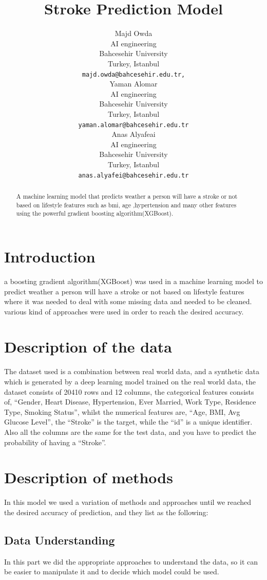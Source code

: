 \documentclass{article}
\title{Stroke Prediction Model}
\author{%
  Majd Owda \\
  AI engineering\\
  Bahcesehir University\\
  Turkey, Istanbul \\
  \texttt{majd.owda@bahcesehir.edu.tr,} \\
  \And 
  Yaman Alomar \\
  AI engineering\\
  Bahcesehir University\\
  Turkey, Istanbul \\
  \texttt{yaman.alomar@bahcesehir.edu.tr} \\
  \And 
  Anas Alyafeai \\
  AI engineering\\
  Bahcesehir University\\
  Turkey, Istanbul \\
   \texttt{anas.alyafei@bahcesehir.edu.tr} \\
  }
\begin{document}
\maketitle


\begin{abstract}
  A machine learning model that predicts weather a person will have a stroke or not based on lifestyle features such as bmi, age ,hypertension and many other features using the powerful gradient boosting algorithm(XGBoost).
\end{abstract}


\section{Introduction}
a boosting gradient algorithm(XGBoost) was used in a machine learning model to predict weather a person will have a stroke or not based on lifestyle features where it was needed to deal with some missing data and needed to be cleaned.  
various kind of approaches were used in order to reach the desired accuracy.




\section{Description of the data}


The dataset used is a combination between real world data, and a synthetic data which is generated by a deep learning model trained on the real world data, the dataset consists of 20410 rows and 12 columns, the categorical features consists of,  “Gender, Heart Disease, Hypertension, Ever Married, Work Type, Residence Type, Smoking Status”, whilst the numerical features are, “Age, BMI, Avg Glucose Level”,  the “Stroke” is the target, while the “id” is a unique identifier. Also all the columns are the same for the test data, and you have to predict the probability of having a “Stroke”.

\section{Description of methods}
In this model we used a variation of methods and approaches until we reached the desired accuracy of prediction, and they list as the following:

\subsection{Data Understanding}
In this part we did the appropriate approaches to understand the data, so it can be easier to manipulate it and to decide which model could be used.
\end{document}
